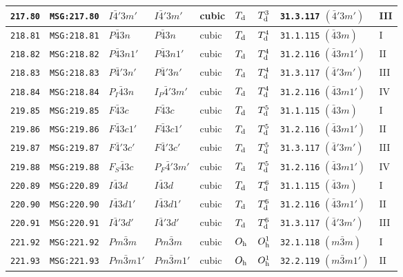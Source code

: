 \documentclass[fleqn,10pt]{jsarticle}
\begin{document}
\begin{center}
\begin{longtable}{lllllllll}
\texttt{217.80} & \texttt{MSG:217.80} & $I\bar{4}'3m'$ & $I\bar{4}'3m'$ & cubic & $T_{\rm d}$ & $T_{\rm d}^{3}$ & \texttt{31.3.117} $(\bar{4}'3m')$ & III \\ \hline
\texttt{218.81} & \texttt{MSG:218.81} & $P\bar{4}3n$ & $P\bar{4}3n$ & cubic & $T_{\rm d}$ & $T_{\rm d}^{4}$ & \texttt{31.1.115} $(\bar{4}3m)$ & I \\
\texttt{218.82} & \texttt{MSG:218.82} & $P\bar{4}3n1'$ & $P\bar{4}3n1'$ & cubic & $T_{\rm d}$ & $T_{\rm d}^{4}$ & \texttt{31.2.116} $(\bar{4}3m1')$ & II \\
\texttt{218.83} & \texttt{MSG:218.83} & $P\bar{4}'3n'$ & $P\bar{4}'3n'$ & cubic & $T_{\rm d}$ & $T_{\rm d}^{4}$ & \texttt{31.3.117} $(\bar{4}'3m')$ & III \\
\texttt{218.84} & \texttt{MSG:218.84} & $P_{I}\bar{4}3n$ & $I_{P}\bar{4}'3m'$ & cubic & $T_{\rm d}$ & $T_{\rm d}^{4}$ & \texttt{31.2.116} $(\bar{4}3m1')$ & IV \\ \hline
\texttt{219.85} & \texttt{MSG:219.85} & $F\bar{4}3c$ & $F\bar{4}3c$ & cubic & $T_{\rm d}$ & $T_{\rm d}^{5}$ & \texttt{31.1.115} $(\bar{4}3m)$ & I \\
\texttt{219.86} & \texttt{MSG:219.86} & $F\bar{4}3c1'$ & $F\bar{4}3c1'$ & cubic & $T_{\rm d}$ & $T_{\rm d}^{5}$ & \texttt{31.2.116} $(\bar{4}3m1')$ & II \\
\texttt{219.87} & \texttt{MSG:219.87} & $F\bar{4}'3c'$ & $F\bar{4}'3c'$ & cubic & $T_{\rm d}$ & $T_{\rm d}^{5}$ & \texttt{31.3.117} $(\bar{4}'3m')$ & III \\
\texttt{219.88} & \texttt{MSG:219.88} & $F_{S}\bar{4}3c$ & $P_{F}\bar{4}'3m'$ & cubic & $T_{\rm d}$ & $T_{\rm d}^{5}$ & \texttt{31.2.116} $(\bar{4}3m1')$ & IV \\ \hline
\texttt{220.89} & \texttt{MSG:220.89} & $I\bar{4}3d$ & $I\bar{4}3d$ & cubic & $T_{\rm d}$ & $T_{\rm d}^{6}$ & \texttt{31.1.115} $(\bar{4}3m)$ & I \\
\texttt{220.90} & \texttt{MSG:220.90} & $I\bar{4}3d1'$ & $I\bar{4}3d1'$ & cubic & $T_{\rm d}$ & $T_{\rm d}^{6}$ & \texttt{31.2.116} $(\bar{4}3m1')$ & II \\
\texttt{220.91} & \texttt{MSG:220.91} & $I\bar{4}'3d'$ & $I\bar{4}'3d'$ & cubic & $T_{\rm d}$ & $T_{\rm d}^{6}$ & \texttt{31.3.117} $(\bar{4}'3m')$ & III \\ \hline
\texttt{221.92} & \texttt{MSG:221.92} & $Pm\bar{3}m$ & $Pm\bar{3}m$ & cubic & $O_{\rm h}$ & $O_{\rm h}^{1}$ & \texttt{32.1.118} $(m\bar{3}m)$ & I \\
\texttt{221.93} & \texttt{MSG:221.93} & $Pm\bar{3}m1'$ & $Pm\bar{3}m1'$ & cubic & $O_{\rm h}$ & $O_{\rm h}^{1}$ & \texttt{32.2.119} $(m\bar{3}m1')$ & II \\

\end{longtable}
\end{center}
\end{document}
